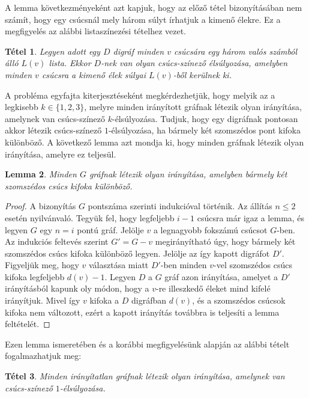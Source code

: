 \documentclass[12pt, a4paper]{report}
\newtheorem{tét}{Tétel}[section]
\newtheorem{lem}[tét]{Lemma}
\theoremstyle{remark}
\theoremstyle{definition}
\begin{document}
A lemma következményeként azt kapjuk, hogy az előző tétel bizonyításában nem számít, hogy egy csúcsnál mely három súlyt írhatjuk a kimenő élekre. Ez a megfigyelés az alábbi listaszínezési tételhez vezet.

\begin{tét}
Legyen adott egy $D$ digráf minden $v$ csúcsára egy három valós számból álló $L(v)$ lista. Ekkor $D$-nek van olyan csúcs-színező élsúlyozása, amelyben minden $v$ csúcsra a kimenő élek súlyai $L(v)$-ből kerülnek ki.
\end{tét}

A probléma egyfajta kiterjesztéseként megkérdezhetjük, hogy melyik az a legkisebb $k \in \lbrace 1, 2, 3 \rbrace$, melyre minden irányított gráfnak létezik olyan irányítása, amelynek van csúcs-színező $k$-élsúlyozása. Tudjuk, hogy egy digráfnak pontosan akkor létezik csúcs-színező $1$-élsúlyozása, ha bármely két szomszédos pont kifoka különböző. A következő lemma azt mondja ki, hogy minden gráfnak létezik olyan irányítása, amelyre ez teljesül.

\begin{lem}
Minden $G$ gráfnak létezik olyan irányítása, amelyben bármely két szomszédos csúcs kifoka különböző.
\end{lem}

\begin{proof}
A bizonyítás $G$ pontszáma szerinti indukcióval történik. Az állítás $n \leq 2$ esetén nyilvánvaló. Tegyük fel, hogy legfeljebb $i - 1$ csúcsra már igaz a lemma, és legyen $G$ egy $n = i$ pontú gráf. Jelölje $v$ a legnagyobb fokszámú csúcsot $G$-ben. Az indukciós feltevés szerint $G' = G - v$ megirányítható úgy, hogy bármely két szomszédos csúcs kifoka különböző legyen. Jelölje az így kapott digráfot $D'$. Figyeljük meg, hogy $v$ választása miatt $D'$-ben minden $v$-vel szomszédos csúcs kifoka legfeljebb $d(v) - 1$. Legyen $D$ a $G$ gráf azon irányítása, amelyet a $D'$ irányításból kapunk oly módon, hogy a $v$-re illeszkedő éleket mind kifelé irányítjuk. Mivel így $v$ kifoka a $D$ digráfban $d(v)$, és a szomszédos csúcsok kifoka nem változott, ezért a kapott irányítás továbbra is teljesíti a lemma feltételét.
\end{proof}

Ezen lemma ismeretében és a korábbi megfigyelésünk alapján az alábbi tételt fogalmazhatjuk meg:

\begin{tét}
Minden irányítatlan gráfnak létezik olyan irányítása, amelynek van csúcs-színező $1$-élsúlyozása.
\end{tét}

\nocite{Dudek2011}
\printbibliography
\end{document}
